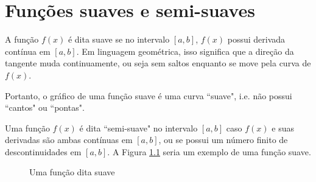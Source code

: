 \chapter{Funções suaves e semi-suaves}

A função $f(x)$ é dita suave se no intervalo $[a, b]$, $f(x)$
possui derivada contínua em $[a,b]$. Em linguagem geométrica,
isso significa que a direção da tangente muda continuamente,
ou seja sem saltos enquanto se move pela curva de $f(x)$.

Portanto, o gráfico de uma função suave é uma curva ``suave",
i.e. não possui ``cantos" ou ``pontas".

Uma função $f(x)$ é dita ``semi-suave" no intervalo $[a,b]$
caso $f(x)$ e suas derivadas são ambas contínuas em $[a,b]$,
ou se possui um número finito de descontinuidades em $[a,b]$.
A Figura \ref{fig:suave} seria um exemplo de uma função suave.

\begin{figure}[H]
\begin{center}
    
\end{center}
    \caption{Uma função dita suave}
    \label{fig:suave}
\end{figure}



